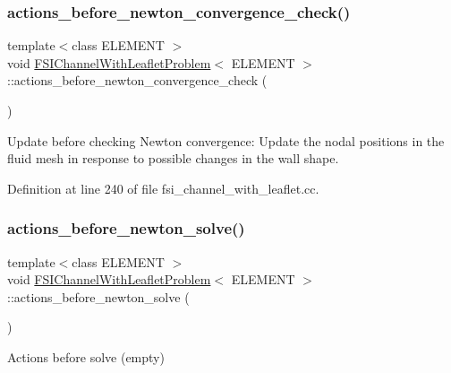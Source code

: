 \subsubsection{\texorpdfstring{actions\+\_\+before\+\_\+newton\+\_\+convergence\+\_\+check()}{actions\_before\_newton\_convergence\_check()}}
{\footnotesize\ttfamily template$<$class E\+L\+E\+M\+E\+NT $>$ \\
void \hyperlink{classFSIChannelWithLeafletProblem}{F\+S\+I\+Channel\+With\+Leaflet\+Problem}$<$ E\+L\+E\+M\+E\+NT $>$\+::actions\+\_\+before\+\_\+newton\+\_\+convergence\+\_\+check (\begin{DoxyParamCaption}{ }\end{DoxyParamCaption})\hspace{0.3cm}{\ttfamily [inline]}}



Update before checking Newton convergence\+: Update the nodal positions in the fluid mesh in response to possible changes in the wall shape. 



Definition at line 240 of file fsi\+\_\+channel\+\_\+with\+\_\+leaflet.\+cc.

\mbox{\label{classFSIChannelWithLeafletProblem_a8a32ef77f32b3283b4b509669deb0a11}} 
\subsubsection{\texorpdfstring{actions\+\_\+before\+\_\+newton\+\_\+solve()}{actions\_before\_newton\_solve()}}
{\footnotesize\ttfamily template$<$class E\+L\+E\+M\+E\+NT $>$ \\
void \hyperlink{classFSIChannelWithLeafletProblem}{F\+S\+I\+Channel\+With\+Leaflet\+Problem}$<$ E\+L\+E\+M\+E\+NT $>$\+::actions\+\_\+before\+\_\+newton\+\_\+solve (\begin{DoxyParamCaption}{ }\end{DoxyParamCaption})\hspace{0.3cm}{\ttfamily [inline]}}



Actions before solve (empty) 



